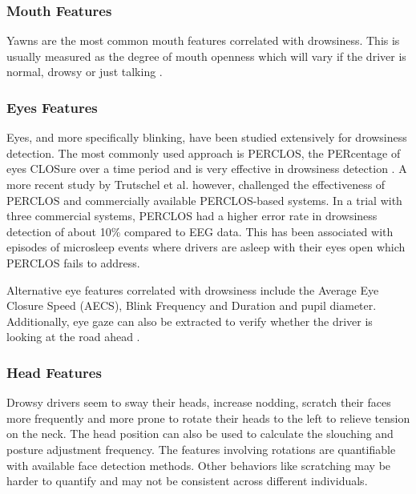\documentclass[a4paper, 12pt]{extarticle}
\begin{document}
\hypertarget{mouth-features}{%
\subsubsection{Mouth Features}\label{mouth-features}}

Yawns are the most common mouth features correlated with drowsiness.
This is usually measured as the degree of mouth openness which will vary
if the driver is normal, drowsy or just talking
\cite{qiong_wang_driver_2006}.

\hypertarget{eyes-features}{%
\subsubsection{Eyes Features}\label{eyes-features}}

Eyes, and more specifically blinking, have been studied extensively for
drowsiness detection. The most commonly used approach is PERCLOS, the
PERcentage of eyes CLOSure over a time period and is very effective in
drowsiness detection \cite{sahayadhas_detecting_2012}. A more recent
study by Trutschel et al. \cite{trutschel_perclos:_2011} however,
challenged the effectiveness of PERCLOS and commercially available
PERCLOS-based systems. In a trial with three commercial systems, PERCLOS
had a higher error rate in drowsiness detection of about 10\% compared
to EEG data. This has been associated with episodes of microsleep events
where drivers are asleep with their eyes open which PERCLOS fails to
address.

Alternative eye features correlated with drowsiness include the Average
Eye Closure Speed (AECS), Blink Frequency and Duration and pupil
diameter. Additionally, eye gaze can also be extracted to verify whether
the driver is looking at the road ahead \cite{qiong_wang_driver_2006}.

\hypertarget{head-features}{%
\subsubsection{Head Features}\label{head-features}}

Drowsy drivers seem to sway their heads, increase nodding, scratch their
faces more frequently and more prone to rotate their heads to the left
to relieve tension on the neck. The head position can also be used to
calculate the slouching and posture adjustment frequency. The features
involving rotations are quantifiable with available face detection
methods. Other behaviors like scratching may be harder to quantify and
may not be consistent across different individuals.
\cite{eskandarian_evaluation_2007}
\end{document}
